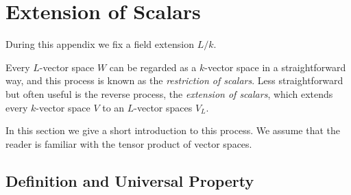 \section{Extension of Scalars}
\label{appendix: extension of scalars}


\begin{conventions}
  During this appendix we fix a field extension $L/k$.
\end{conventions}


\begin{fluff}
  Every $L$-vector space $W$ can be regarded as a $k$-vector space in a straightforward way, and this process is known as the \emph{restriction of scalars}.
  Less straightforward but often useful is the reverse process, the \emph{extension of scalars}, which extends every $k$-vector space $V$ to an $L$-vector spaces $V_L$.
  
  In this section we give a short introduction to this process.
  We assume that the reader is familiar with the tensor product of vector spaces.
\end{fluff}



\subsection{Definition and Universal Property}


